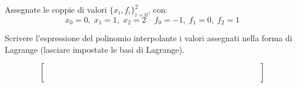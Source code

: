 Assegnate le coppie di valori $\{x_i,f_i \}_{i=0}^2$, con: 
\[ 
x_0=0, \; x_1=1, \; x_2=2 \quad f_0=-1, \; f_1=0, \; f_2=1 
\]

\noindent Scrivere l'espressione del polinomio interpolante i 
valori assegnati nella forma di Lagrange (lasciare impostate le 
basi di Lagrange).

\[
\left [
\begin{array}{cccccccccccccc}
  \quad &  \quad & \quad &  \quad &  \quad &  \quad &  \quad  \quad & \quad &  \quad & \quad &  \quad & \quad & \quad &  \quad  \\
  \quad & \quad & \quad &  \quad &  \quad &  \quad &  \quad  \quad & \quad &  \quad & \quad &  \quad & \quad & \quad &  \quad \\
 \quad &  \quad & \quad &  \quad &  \quad &  \quad &  \quad  \quad & \quad &  \quad & \quad &  \quad & \quad & \quad &  \quad \\
   \quad &  \quad & \quad &  \quad &  \quad &  \quad &  \quad  \quad & \quad &  \quad & \quad &  \quad & \quad & \quad &  \quad  \\
  \quad &  \quad & \quad &  \quad &  \quad &  \quad &  \quad  \quad & \quad &  \quad & \quad &  \quad & \quad & \quad &  \quad  
\end{array}\right]
\]
